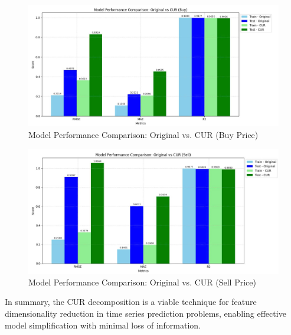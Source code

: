 \begin{figure}[H]
    \centering
    \includegraphics[width=0.8\linewidth]{images/buy_metrics}
    \caption{Model Performance Comparison: Original vs. CUR (Buy Price)}
    \label{fig:buy_metrics}
\end{figure}

\begin{figure}[H]
    \centering
    \includegraphics[width=0.8\linewidth]{images/sell_metrics}
    \caption{Model Performance Comparison: Original vs. CUR (Sell Price)}
    \label{fig:sell_metrics}
\end{figure}

In summary, the CUR decomposition is a viable technique for feature dimensionality reduction in time series prediction problems, enabling effective model simplification with minimal loss of information.
